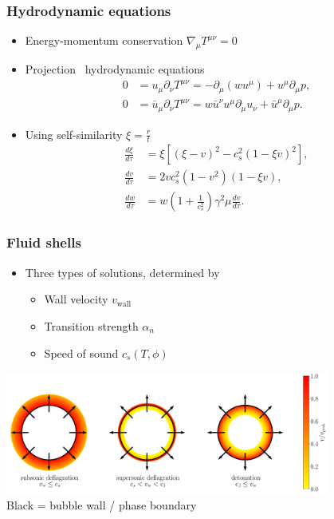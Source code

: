 \begin{frame}
    \frametitle{Hydrodynamic equations}
    \begin{itemize}
        \item Energy-momentum conservation $\nabla_\mu T^{\mu\nu} = 0$
        \item Projection \textrightarrow \ hydrodynamic equations
        \begin{align}
            0 &= u_\mu \partial_\nu T^{\mu \nu} = -\partial_\mu (w u^\mu) + u^\mu \partial_\mu p, \\
            0 &= \bar{u}_\mu \partial_\nu T^{\mu \nu} = w \bar{u}^\nu u^\mu \partial_\mu u_\nu + \bar{u}^\mu \partial_\mu p.
        \end{align}
        \item Using self-similarity $\xi = \frac{r}{t}$
        \begin{align}
            \frac{d\xi}{d\tau} &= \xi \left[ (\xi - v)^2 - c_s^2 (1 - \xi v)^2 \right], \\
            \frac{dv}{d\tau} &= 2 v c_s^2 (1 - v^2) (1 - \xi v), \\
            \frac{dw}{d\tau} &= w \left( 1 + \frac{1}{c_s^2} \right) \gamma^2 \mu \frac{dv}{d\tau}.
        \end{align}
    \end{itemize}
\end{frame}

\begin{frame}
    \frametitle{Fluid shells}
    \begin{itemize}
        \item Three types of solutions, determined by
        \begin{itemize}
            \item Wall velocity $v_\text{wall}$
            \item Transition strength $\alpha_n$
            \item Speed of sound $c_s(T,\phi)$
        \end{itemize}
    \end{itemize}
    \includegraphics[width=0.8\textwidth]{../fig/all_circle.pdf} \\
    {\footnotesize Black = bubble wall / phase boundary}
\end{frame}

